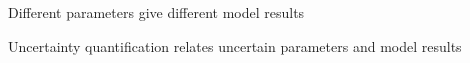 \documentclass[presentation]{beamer}
\begin{document}
\begin{frame}{Different parameters give different model results}
    \begin{figure}
      \end{figure}

\end{frame}


\begin{frame}{Uncertainty quantification relates uncertain parameters and model results}
    \begin{figure}
    \end{figure}
\end{frame}
\end{document}
